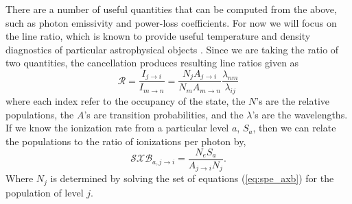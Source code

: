 There are a number of useful quantities that can be computed from the above, such as photon emissivity and power-loss coefficients. For now we will focus on the line ratio, which is known to provide useful temperature and density diagnostics of particular astrophysical objects \citep{1988A&A...193..327N}. Since we are taking the ratio of two quantities, the cancellation produces resulting line ratios given as
\begin{equation}\label{eq:spe_lratio}
\mathcal{R} = \frac{I_{j\rightarrow i}}{I_{m \rightarrow n}} = \frac{N_j A_{j\rightarrow i}}{N_m A_{m\rightarrow n}}\frac{\lambda_{nm}}{\lambda_{ij}}
\end{equation}
where each index refer to the occupancy of the state, the $N$'s are the relative populations, the $A$'s are transition probabilities, and the $\lambda$'s are the wavelengths. If we know the ionization rate from a particular level $a$, $S_a$, then we can relate the populations to the ratio of ionizations per photon by,
\begin{equation}\label{eq:spe_sxb}
\mathcal{SXB}_{a,j\rightarrow i} = \frac{N_eS_a}{A_{j\rightarrow i}N_{j}}.
\end{equation}
Where $N_{j}$ is determined by solving the set of equations (\ref{eq:spe_axb}) for the population of level $j$.

